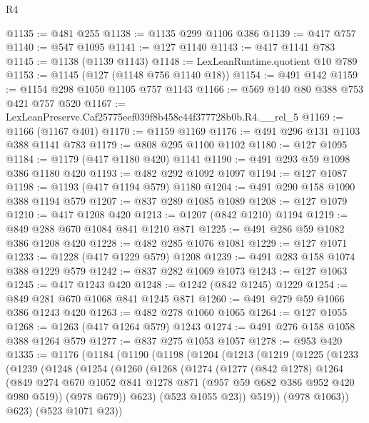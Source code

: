 \begin{lexlean}{R4}
\begin{coremodule}
@1135 := @481 @255
@1138 := @1135 @299 @1106 @386
@1139 := @417 @757
@1140 := @547 @1095
@1141 := @127 @1140
@1143 := @417 @1141 @783
@1145 := @1138 (@1139 @1143)
@1148 := LexLeanRuntime.quotient @10 @789
@1153 := @1145 (@127 (@1148 @756 @1140 @18))
@1154 := @491 @142
@1159 := @1154 @298 @1050 @1105 @757 @1143
@1166 := @569 @140 @80 @388 @753 @421 @757 @520
@1167 := LexLeanPreserve.Caf25775eef039f8b458c44f377728b0b.R4.__rel_5
@1169 := @1166 (@1167 @401)
@1170 := @1159 @1169
@1176 := @491 @296 @131 @1103 @388 @1141 @783
@1179 := @808 @295 @1100 @1102
@1180 := @127 @1095
@1184 := @1179 (@417 @1180 @420) @1141
@1190 := @491 @293 @59 @1098 @386 @1180 @420
@1193 := @482 @292 @1092 @1097
@1194 := @127 @1087
@1198 := @1193 (@417 @1194 @579) @1180
@1204 := @491 @290 @158 @1090 @388 @1194 @579
@1207 := @837 @289 @1085 @1089
@1208 := @127 @1079
@1210 := @417 @1208 @420
@1213 := @1207 (@842 @1210) @1194
@1219 := @849 @288 @670 @1084 @841 @1210 @871
@1225 := @491 @286 @59 @1082 @386 @1208 @420
@1228 := @482 @285 @1076 @1081
@1229 := @127 @1071
@1233 := @1228 (@417 @1229 @579) @1208
@1239 := @491 @283 @158 @1074 @388 @1229 @579
@1242 := @837 @282 @1069 @1073
@1243 := @127 @1063
@1245 := @417 @1243 @420
@1248 := @1242 (@842 @1245) @1229
@1254 := @849 @281 @670 @1068 @841 @1245 @871
@1260 := @491 @279 @59 @1066 @386 @1243 @420
@1263 := @482 @278 @1060 @1065
@1264 := @127 @1055
@1268 := @1263 (@417 @1264 @579) @1243
@1274 := @491 @276 @158 @1058 @388 @1264 @579
@1277 := @837 @275 @1053 @1057
@1278 := @953 @420
@1335 := @1176
    (@1184
      (@1190
        (@1198
          (@1204
            (@1213
              (@1219
                (@1225
                  (@1233
                    (@1239
                      (@1248
                        (@1254
                          (@1260
                            (@1268
                              (@1274
                                (@1277
                                  (@842 @1278)
                                  @1264
                                  (@849
                                    @274
                                    @670
                                    @1052
                                    @841
                                    @1278
                                    @871
                                    (@957 @59 @682 @386 @952 @420 @980 @519))
                                  (@978 @679))
                                @623)
                              (@523 @1055 @23))
                            @519))
                        (@978 @1063))
                      @623)
                    (@523 @1071 @23))

\end{coremodule}
\end{lexlean}
